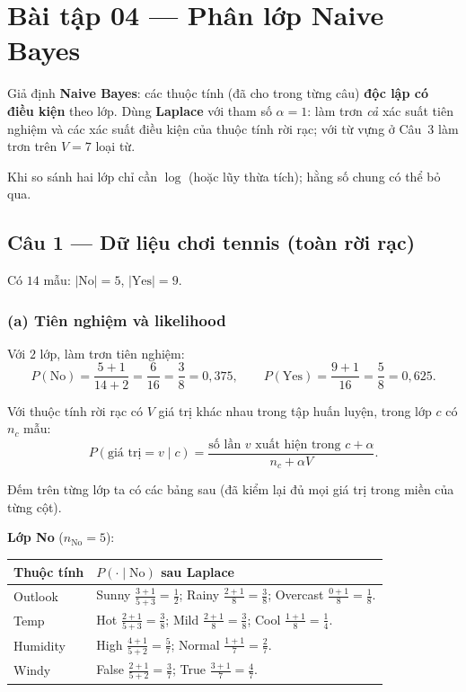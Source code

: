 \section*{Bài tập 04 --- Phân lớp Naive Bayes}

Giả định \textbf{Naive Bayes}: các thuộc tính (đã cho trong từng câu) \textbf{độc lập có điều kiện} theo lớp. Dùng \textbf{Laplace} với tham số \(\alpha=1\): làm trơn \emph{cả} xác suất tiên nghiệm và các xác suất điều kiện của thuộc tính rời rạc; với từ vựng ở Câu~3 làm trơn trên \(V=7\) loại từ.

Khi so sánh hai lớp chỉ cần \(\log\) (hoặc lũy thừa tích); hằng số chung có thể bỏ qua.

\subsection*{Câu 1 --- Dữ liệu chơi tennis (toàn rời rạc)}

Có \(14\) mẫu: \(|\text{No}|=5\), \(|\text{Yes}|=9\).

\subsubsection*{(a) Tiên nghiệm và likelihood}

Với \(2\) lớp, làm trơn tiên nghiệm:
\[
P(\text{No})=\frac{5+1}{14+2}=\frac{6}{16}=\frac{3}{8}=0{,}375,\qquad
P(\text{Yes})=\frac{9+1}{16}=\frac{5}{8}=0{,}625.
\]

Với thuộc tính rời rạc có \(V\) giá trị khác nhau trong tập huấn luyện, trong lớp \(c\) có \(n_c\) mẫu:
\[
P(\text{giá trị}=v\mid c)=\frac{\text{số lần }v\text{ xuất hiện trong }c+\alpha}{n_c+\alpha V}.
\]

Đếm trên từng lớp ta có các bảng sau (đã kiểm lại đủ mọi giá trị trong miền của từng cột).

\medskip
\noindent\textbf{Lớp No} (\(n_{\text{No}}=5\)):

\begin{center}
{\small
\begin{tabular}{@{}ll@{}}\toprule
Thuộc tính & \(P(\cdot\mid \text{No})\) sau Laplace \\\midrule
Outlook &
  Sunny \(\frac{3+1}{5+3}=\frac12\); Rainy \(\frac{2+1}{8}=\frac38\); Overcast \(\frac{0+1}{8}=\frac18\). \\
Temp &
  Hot \(\frac{2+1}{5+3}=\frac38\); Mild \(\frac{2+1}{8}=\frac38\); Cool \(\frac{1+1}{8}=\frac14\). \\
Humidity &
  High \(\frac{4+1}{5+2}=\frac57\); Normal \(\frac{1+1}{7}=\frac27\). \\
Windy &
  False \(\frac{2+1}{5+2}=\frac37\); True \(\frac{3+1}{7}=\frac47\). \\
\bottomrule
\end{tabular}
}
\end{center}

